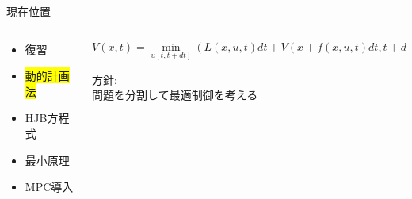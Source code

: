 \documentclass[dvipdfmx,12pt]{beamer}
\begin{document}
    \begin{frame}{現在位置}
        \footnotesize
        \begin{columns}
            \begin{column}{.35\textwidth}
                \begin{itemize}
                    \item 復習
                    \item \colorbox{yellow}{動的計画法}
                    \item HJB方程式
                    \item 最小原理
                    \item MPC導入
                \end{itemize}
            \end{column}
    
            \begin{column}{.7\textwidth}
                \fontsize{7.5pt}{3.5pt}\selectfont
                \begin{screen}
                    \begin{equation*}
                        V(x, t) = \min_{u[t, t+dt]} \left( L(x, u, t) dt + V \left( x + f(x, u, t) dt, t + dt \right) \right)
                    \end{equation*}
                \end{screen}
                \footnotesize
                方針:\\
                \qquad 問題を分割して最適制御を考える \\

            \end{column}
        \end{columns}
    \end{frame}
\end{document}
